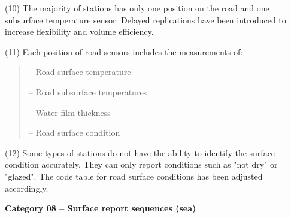 (10) The majority of stations has only one position on the road and one subsurface temperature sensor. Delayed replications have been introduced to increase flexibility and volume efficiency.

(11) Each position of road sensors includes the measurements of:

\begin{quote}
-- Road surface temperature

-- Road subsurface temperatures

-- Water film thickness

-- Road surface condition
\end{quote}

(12) Some types of stations do not have the ability to identify the surface condition accurately. They can only report conditions such as "not dry" or "glazed". The code table for road surface conditions has been adjusted accordingly.

\textbf{Category 08 -- Surface report sequences (sea)}

